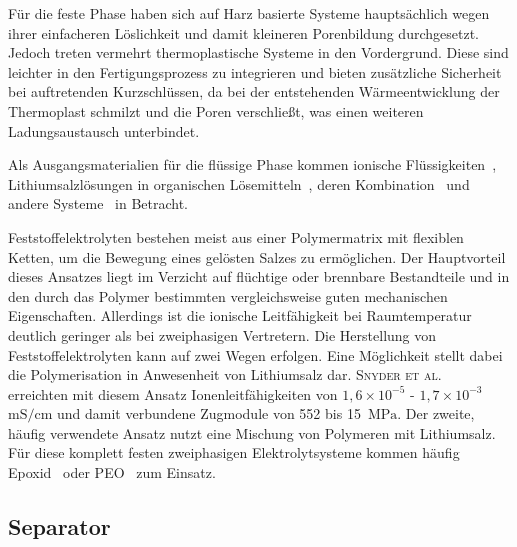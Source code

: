 Für die feste Phase haben sich auf Harz basierte Systeme hauptsächlich wegen ihrer einfacheren Löslichkeit und damit kleineren Porenbildung durchgesetzt. Jedoch treten vermehrt thermoplastische Systeme in den Vordergrund. Diese sind leichter in den Fertigungsprozess zu integrieren und bieten zusätzliche Sicherheit bei auftretenden Kurzschlüssen, da bei der entstehenden Wärmeentwicklung der Thermoplast schmilzt und die Poren verschließt, was einen weiteren Ladungsaustausch unterbindet.

Als Ausgangsmaterialien für die flüssige Phase kommen ionische Flüssigkeiten~\cite{Huang2022,Shirshova2013,Wendong2021,Shirshova2014,Dzienia2020}, Lithiumsalzlösungen in organischen Lösemitteln~\cite{Gienger2015,Sakakibara2017}, deren Kombination~\cite{Shirshova2014,Yu2016} und andere Systeme~\cite{Feng2017} in Betracht.

Feststoffelektrolyten bestehen meist aus einer Polymermatrix mit flexiblen Ketten, um die Bewegung eines gelösten Salzes zu ermöglichen. Der Hauptvorteil dieses Ansatzes liegt im Verzicht auf flüchtige oder brennbare Bestandteile und in den durch das Polymer bestimmten vergleichsweise guten mechanischen Eigenschaften. Allerdings ist die ionische Leitfähigkeit bei Raumtemperatur deutlich geringer als bei zweiphasigen Vertretern. Die Herstellung von Feststoffelektrolyten kann auf zwei Wegen erfolgen. Eine Möglichkeit stellt dabei die Polymerisation in Anwesenheit von Lithiumsalz dar. \textsc{Snyder et al.}~\cite{Snyder2007, Snyder2009} erreichten mit diesem Ansatz Ionenleitfähigkeiten von $1,6 \times 10^{-5}$ - $1,7 \times 10^{-3}$ $\si{\milli \siemens \per \cm}$ und damit verbundene Zugmodule von 552 bis 15~$\si{\MPa}$. Der zweite, häufig verwendete Ansatz nutzt eine Mischung von Polymeren mit Lithiumsalz. Für diese komplett festen zweiphasigen Elektrolytsysteme kommen häufig Epoxid~\cite{Matsumoto2011,Munoz2021,Wang2020b} oder PEO~\cite{Moreno2011,Ji2010,Guo2021} zum Einsatz.

\subsection{Separator}

